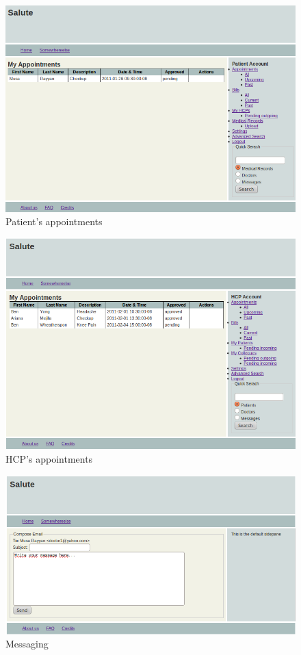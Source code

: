 \documentclass[10pt]{report}
\begin{document}
\begin{figure}
\includegraphics[scale=0.6]{screenshots/Patient_appts.png}
\caption{Patient's appointments}
\end{figure}

\begin{figure}
\includegraphics[scale=0.6]{screenshots/doc_appointments.png}
\caption{HCP's appointments}
\end{figure}

\begin{figure}
\includegraphics[scale=0.6]{screenshots/Messaging.png}
\caption{Messaging}
\end{figure}
\end{document}

